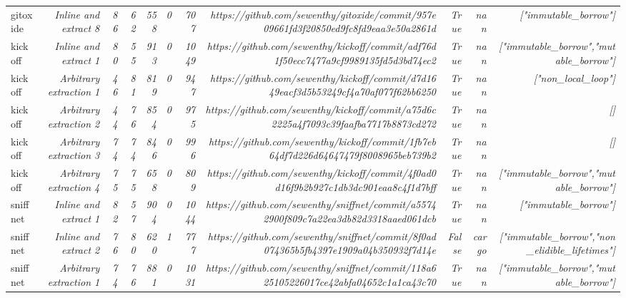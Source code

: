 \begin{landscape}
\begin{table}[]
{\begin{tabular}{lrrrrrrrrrr}
gitoxide & \textit{Inline and extract 8} & \textit{86} & \textit{62} & \textit{558} & \textit{0} & \textit{707} & \textit{https://github.com/sewenthy/gitoxide/commit/957e09661fd3f20850ed9fc8fd9eaa3e50a2861d} & \textit{True} & \textit{nan} & \textit{["immutable\_borrow"]} \\
kickoff & \textit{Inline and extract 1} & \textit{80} & \textit{55} & \textit{913} & \textit{0} & \textit{1049} & \textit{https://github.com/sewenthy/kickoff/commit/adf76d1f50ecc7477a9cf9989135fd5d3bd74ec2} & \textit{True} & \textit{nan} & \textit{["immutable\_borrow","mutable\_borrow"]} \\
kickoff & \textit{Arbitrary extraction 1} & \textit{46} & \textit{81} & \textit{819} & \textit{0} & \textit{947} & \textit{https://github.com/sewenthy/kickoff/commit/d7d1649eacf3d5b53249cf4a70af077f62bb6250} & \textit{True} & \textit{nan} & \textit{["non\_local\_loop"]} \\
kickoff & \textit{Arbitrary extraction 2} & \textit{44} & \textit{76} & \textit{854} & \textit{0} & \textit{975} & \textit{https://github.com/sewenthy/kickoff/commit/a75d6c2225a4f7093c39faafba7717b8873cd272} & \textit{True} & \textit{nan} & \textit{[]} \\
kickoff & \textit{Arbitrary extraction 3} & \textit{74} & \textit{74} & \textit{846} & \textit{0} & \textit{996} & \textit{https://github.com/sewenthy/kickoff/commit/1fb7eb64df7d226d64647479f8008965beb739b2} & \textit{True} & \textit{nan} & \textit{[]} \\
kickoff & \textit{Arbitrary extraction 4} & \textit{75} & \textit{75} & \textit{658} & \textit{0} & \textit{809} & \textit{https://github.com/sewenthy/kickoff/commit/4f0ad0d16f9b2b927c1db3dc901eaa8c4f1d7bff} & \textit{True} & \textit{nan} & \textit{["immutable\_borrow","mutable\_borrow"]} \\
sniffnet & \textit{Inline and extract 1} & \textit{82} & \textit{57} & \textit{904} & \textit{0} & \textit{1044} & \textit{https://github.com/sewenthy/sniffnet/commit/a55742900f809c7a22ea3db82d3318aaed061dcb} & \textit{True} & \textit{nan} & \textit{["immutable\_borrow"]} \\
sniffnet & \textit{Inline and extract 2} & \textit{76} & \textit{80} & \textit{620} & \textit{1} & \textit{777} & \textit{https://github.com/sewenthy/sniffnet/commit/8f0ad074365b5fb4397e1909a04b350932f7d14e} & \textit{False} & \textit{cargo} & \textit{["immutable\_borrow","non\_elidible\_lifetimes"]} \\
sniffnet & \textit{Arbitrary extraction 1} & \textit{74} & \textit{76} & \textit{881} & \textit{0} & \textit{1031} & \textit{https://github.com/sewenthy/sniffnet/commit/118a625105226017ce42abfa04652c1a1ca43c70} & \textit{True} & \textit{nan} & \textit{["immutable\_borrow","mutable\_borrow"]} \\

\end{tabular}}
\end{table}
\end{landscape}
